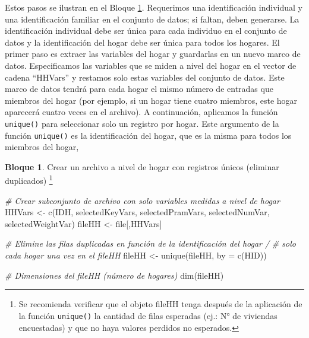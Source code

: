 \documentclass[
]{book}
\newenvironment{Shaded}{\begin{snugshade}}{\end{snugshade}}
\newcommand{\AttributeTok}[1]{\textcolor[rgb]{0.77,0.63,0.00}{#1}}
\newcommand{\CommentTok}[1]{\textcolor[rgb]{0.56,0.35,0.01}{\textit{#1}}}
\newcommand{\FunctionTok}[1]{\textcolor[rgb]{0.00,0.00,0.00}{#1}}
\newcommand{\NormalTok}[1]{#1}
\newcommand{\OtherTok}[1]{\textcolor[rgb]{0.56,0.35,0.01}{#1}}
\newcommand{\StringTok}[1]{\textcolor[rgb]{0.31,0.60,0.02}{#1}}
\theoremstyle{definition}
\theoremstyle{definition}
\newtheorem{example}{Bloque}[chapter]
\theoremstyle{definition}
\theoremstyle{definition}
\theoremstyle{remark}
\begin{document}
Estos pasos se ilustran en el Bloque \ref{exm:bloqueMicro12}. Requerimos una identificación individual y una identificación familiar en el conjunto de datos; si faltan, deben generarse. La identificación individual debe ser única para cada individuo en el conjunto de datos y la identificación del hogar debe ser única para todos los hogares. El primer paso es extraer las variables del hogar y guardarlas en un nuevo marco de datos. Especificamos las variables que se miden a nivel del hogar en el vector de cadena ``HHVars'' y restamos solo estas variables del conjunto de datos. Este marco de datos tendrá para cada hogar el mismo número de entradas que miembros del hogar (por ejemplo, si un hogar tiene cuatro miembros, este hogar aparecerá cuatro veces en el archivo). A continuación, aplicamos la función \texttt{unique()} para seleccionar solo un registro por hogar. Este argumento de la función \texttt{unique()} es la identificación del hogar, que es la misma para todos los miembros del hogar,

\begin{example}
\protect\hypertarget{exm:bloqueMicro12}{}\label{exm:bloqueMicro12}Crear un archivo a nivel de hogar con registros únicos (eliminar duplicados) \footnote{Se recomienda verificar que el objeto fileHH tenga después de la aplicación de la función \texttt{unique()} la cantidad de filas esperadas (ej.: N° de viviendas encuestadas) y que no haya valores perdidos no esperados.}
\end{example}

\begin{Shaded}
\begin{Highlighting}[]
\CommentTok{\# Crear subconjunto de archivo con solo variables medidas a nivel de hogar}
\NormalTok{HHVars }\OtherTok{\textless{}{-}} \FunctionTok{c}\NormalTok{(}\StringTok{\textquotesingle{}IDH\textquotesingle{}}\NormalTok{, selectedKeyVars, selectedPramVars, selectedNumVar, selectedWeightVar)}
\NormalTok{fileHH }\OtherTok{\textless{}{-}}\NormalTok{ file[,HHVars]}

\CommentTok{\# Elimine las filas duplicadas en función de la identificación del hogar / }
\CommentTok{\# solo cada hogar una vez en el fileHH}
\NormalTok{fileHH }\OtherTok{\textless{}{-}} \FunctionTok{unique}\NormalTok{(fileHH, }\AttributeTok{by =} \FunctionTok{c}\NormalTok{(}\StringTok{\textquotesingle{}HID\textquotesingle{}}\NormalTok{))}

\CommentTok{\# Dimensiones del fileHH (número de hogares)}
\FunctionTok{dim}\NormalTok{(fileHH)}
\end{Highlighting}
\end{Shaded}
\end{document}
